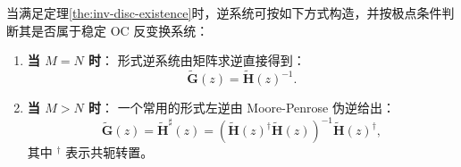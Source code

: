 \begin{theorem}[形式逆系统的构造]
    当满足定理\ref{the:inv-disc-existence}时，逆系统可按如下方式构造，并按极点条件判断其是否属于稳定 OC 反变换系统：

    \begin{enumerate}
        \item \textbf{当 $M = N$ 时}：
              形式逆系统由矩阵求逆直接得到：
              \begin{equation}
                  \tilde{\mathbf{G}}(z) = \tilde{\mathbf{H}}(z)^{-1}.
              \end{equation}

        \item \textbf{当 $M > N$ 时}：
              一个常用的形式左逆由 Moore-Penrose 伪逆给出：
              \begin{equation}
                  \tilde{\mathbf{G}}(z)=\tilde{\mathbf{H}}^{\sharp}(z) = \left( \tilde{\mathbf{H}}(z)^\dagger \tilde{\mathbf{H}}(z) \right)^{-1} \tilde{\mathbf{H}}(z)^\dagger,
              \end{equation}
              其中 $^\dagger$ 表示共轭转置。
    \end{enumerate}
\end{theorem}

